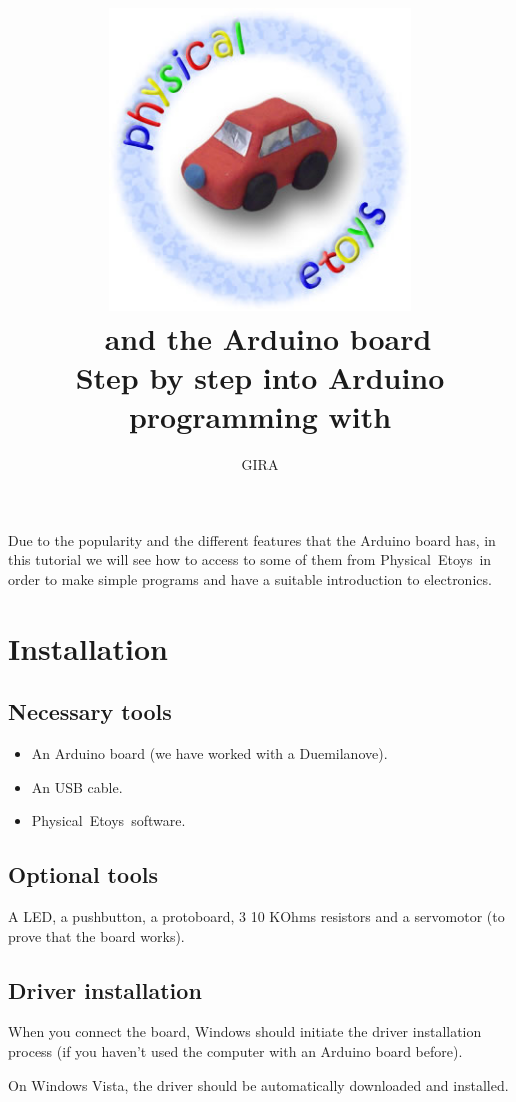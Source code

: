 \documentclass[english]{etoys-guide}
\title{
	\includegraphics[width=8cm]{../../shared/images/physical_etoys_logo.jpg}\\
	\vfill
	\vspace{3em}
	\LARGE{\textbf{\appName~and the Arduino board}}\\[1cm]
	\large{Step by step into Arduino programming with \appName}\\[1cm]
	\vfill
}
\author{
GIRA
}
\def\appName{Physical~Etoys~}
\begin{document}

\maketitle

\cleardoublepage
\tableofcontents
\cleardoublepage

Due to the popularity and the different features that the Arduino board has, in
this tutorial we will see how to access to some of them from \appName in
order to make simple programs and have a suitable introduction to electronics.  

\section{Installation}

\subsection{Necessary tools}

\begin{itemize}
	\item An Arduino board (we have worked with a Duemilanove).
	\item An USB cable.
	\item \appName software.
\end{itemize}

\subsection{Optional tools}

A LED, a pushbutton, a protoboard, 3 10 KOhms resistors and a servomotor (to
prove that the board works). 

\subsection{Driver installation}

When you connect the board, Windows should initiate the driver installation
process (if you haven't used the computer with an Arduino board before).

On Windows Vista, the driver should be automatically downloaded and installed.
\end{document}
